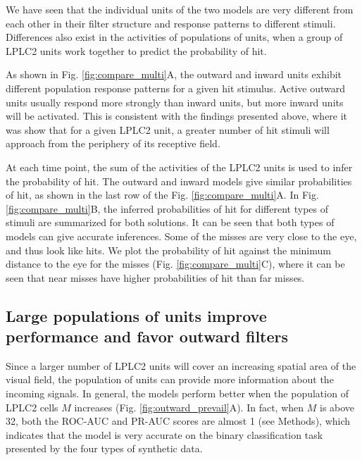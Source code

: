 \documentclass[pdftex,9pt,lineno]{elife}
\begin{document}

We have seen that the individual units of the two models are very different from each other in their filter structure and response patterns to different stimuli. Differences also exist in the activities of populations of units, when a group of LPLC2 units work together to predict the probability of hit.

As shown in Fig. \ref{fig:compare_multi}A, the outward and inward units exhibit different population response patterns for a given hit stimulus. Active outward units usually respond more strongly than inward units, but more inward units will be activated. This is consistent with the findings presented above, where it was show that for a given LPLC2 unit, a greater number of hit stimuli will approach from the periphery of its receptive field.

At each time point, the sum of the activities of the LPLC2 units is used to infer the probability of hit. The outward and inward models give similar probabilities of hit, as shown in the last row of the Fig. \ref{fig:compare_multi}A.
In Fig. \ref{fig:compare_multi}B, the inferred probabilities of hit for different types of stimuli are summarized for both solutions. It can be seen that both types of models can give accurate inferences. Some of the misses are very close to the eye, and thus look like hits. We plot the probability of hit against the minimum distance to the eye for the misses (Fig. \ref{fig:compare_multi}C), where it can be seen that near misses have higher probabilities of hit than far misses.


\subsection{Large populations of units improve performance and favor outward filters}




Since a larger number of LPLC2 units will cover an increasing spatial area of the visual field, the population of units can provide more information about the incoming signals. In general, the models perform better when the population of LPLC2 cells $M$ increases (Fig. \ref{fig:outward_prevail}A). In fact, when $M$ is above 32, both the ROC-AUC and PR-AUC scores are almost 1 (see Methods), which indicates that the model is very accurate on the binary classification task presented by the four types of synthetic data.
\end{document}
